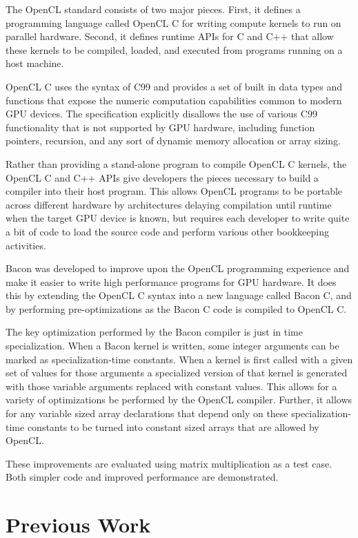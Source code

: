 \documentclass{llncs}
\begin{document}
The OpenCL standard\cite{opencl} consists of two major pieces. First,
it defines a programming language called OpenCL C for writing compute
kernels to run on parallel hardware. Second, it defines runtime APIs
for C and C++ that allow these kernels to be compiled, loaded, and
executed from programs running on a host machine.

OpenCL C uses the syntax of C99 and provides a set of built in data
types and functions that expose the numeric computation capabilities
common to modern GPU devices. The specification explicitly disallows
the use of various C99 functionality that is not supported by GPU
hardware, including function pointers, recursion, and any sort of
dynamic memory allocation or array sizing. 

Rather than providing a stand-alone program to compile OpenCL C
kernels, the OpenCL C and C++ APIs give developers the pieces
necessary to build a compiler into their host program. This allows OpenCL
programs to be portable across different hardware by architectures
delaying compilation until runtime when the target GPU device is
known, but requires each developer to write quite a bit of code to
load the source code and perform various other bookkeeping activities.

Bacon was developed to improve upon the OpenCL programming
experience and make it easier to write high performance programs for
GPU hardware. It does this by extending the OpenCL C syntax into a new
language called Bacon C, and by performing pre-optimizations as
the Bacon C code is compiled to OpenCL C.

The key optimization performed by the Bacon compiler is just in time
specialization. When a Bacon kernel is written, some integer arguments
can be marked as specialization-time constants. When a kernel is first
called with a given set of values for those arguments a specialized
version of that kernel is generated with those variable arguments
replaced with constant values. This allows for a variety of
optimizations be performed by the OpenCL compiler. Further, it allows
for any variable sized array declarations that depend only on these
specialization-time constants to be turned into constant sized arrays
that are allowed by OpenCL.

These improvements are evaluated using matrix multiplication as a test
case. Both simpler code and improved performance are demonstrated.

\section{Previous Work}
\end{document}
